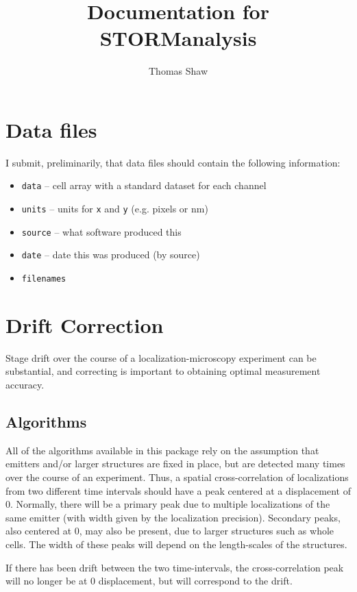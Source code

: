 \documentclass{article}
\title{Documentation for STORManalysis}
\author{Thomas Shaw}
\begin{document}
\maketitle

\section{Data files}
I submit, preliminarily, that data files should contain the following information:
\begin{itemize}
\item \verb|data| -- cell array with a standard dataset for each channel
\item \verb|units| -- units for \verb|x| and \verb|y| (e.g. pixels or nm)
\item \verb|source| -- what software produced this
\item \verb|date| -- date this was produced (by source)
\item \verb|filenames|
\end{itemize}

\section{Drift Correction}
Stage drift over the course of a localization-microscopy experiment can be
substantial, and correcting is important to obtaining optimal measurement
accuracy.

\subsection{Algorithms}

All of the algorithms available in this package rely on the assumption that
emitters and/or larger structures are fixed in place, but are detected many
times over the course of an experiment. Thus, a spatial cross-correlation of
localizations from two different time intervals should have a peak centered
at a displacement of 0. Normally, there will be a primary peak due to multiple
localizations of the same emitter (with width given by the localization precision).
Secondary peaks, also centered at 0, may also be present, due to larger structures
such as whole cells. The width of these peaks will depend on the length-scales of
the structures.

If there has been drift between the two time-intervals, the cross-correlation peak
will no longer be at 0 displacement, but will correspond to the drift.
\end{document}
